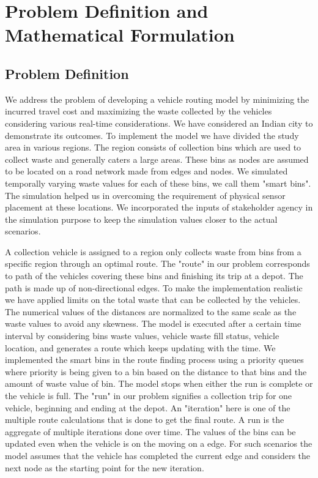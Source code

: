 \documentclass[12pt]{article}
\begin{document}
\section{Problem Definition and Mathematical Formulation}


\subsection{Problem Definition}
We address the problem of developing a vehicle routing model by minimizing the incurred travel cost and maximizing the waste collected by the vehicles considering various real-time considerations. We have considered an Indian city to demonstrate its outcomes. To implement the model we have divided the study area in various regions. The region consists of collection bins which are used to collect waste and generally caters a large areas. These bins as nodes are assumed to be located on a road network made from edges and nodes. We simulated temporally varying waste values for each of these bins, we call them "smart bins". The simulation helped us in overcoming the requirement of physical sensor placement at these locations. We incorporated the inputs of stakeholder agency in the simulation purpose to keep the simulation values closer to the actual scenarios. 
	
A collection vehicle is assigned to a region only collects waste from bins from a specific region through an optimal route.  The "route" in our problem corresponds to path of the vehicles covering these bins and finishing its trip at a depot. The path is made up of  non-directional edges. To make the implementation realistic we have applied limits on the total waste that can be collected by the vehicles. 
The numerical values of the distances are normalized to the same scale as the waste values to avoid any skewness. The model is executed after a certain time interval by considering  bins waste values, vehicle waste fill status, vehicle location,  and generates a route which keeps updating with the time. We implemented the smart bins in the route finding process using a priority queues where priority is being given to a bin based on the distance to that bins and the amount of waste value of bin. The model stops when either the run is complete or the vehicle is full. The "run" in our problem signifies a collection trip for one vehicle, beginning and ending at the depot. An "iteration" here is one of the multiple route calculations that is done to get the final route. A run is the aggregate of multiple iterations done over time. The values of the bins can be updated even when the vehicle is on the moving on a edge.  For such scenarios the model assumes that the vehicle has completed the current edge and considers the next node as the starting point for the new iteration. 
\end{document}
